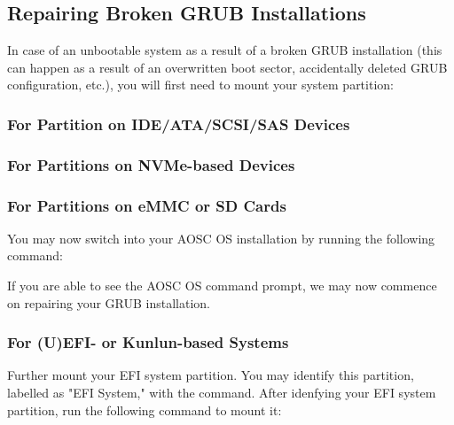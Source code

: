 \documentclass[a5paper,twosided,11pt]{book}
\begin{document}
    \subsection{Repairing Broken GRUB Installations}

    In case of an unbootable system as a result of a broken GRUB installation (this can happen as a result of an overwritten boot sector, accidentally deleted GRUB configuration, etc.), you will first need to mount your system partition:

    \subsubsection*{For Partition on IDE/ATA/SCSI/SAS Devices}


    \subsubsection*{For Partitions on NVMe-based Devices}


    \subsubsection*{For Partitions on eMMC or SD Cards}


    You may now switch into your AOSC OS installation by running the following command:


    If you are able to see the AOSC OS command prompt, we may now commence on repairing your GRUB installation.

    \subsubsection*{For (U)EFI- or Kunlun-based Systems}

    Further mount your EFI system partition. You may identify this partition,
    labelled as "EFI System," with the  command. After idenfying your EFI system partition,
    run the following command to mount it:
\end{document}
